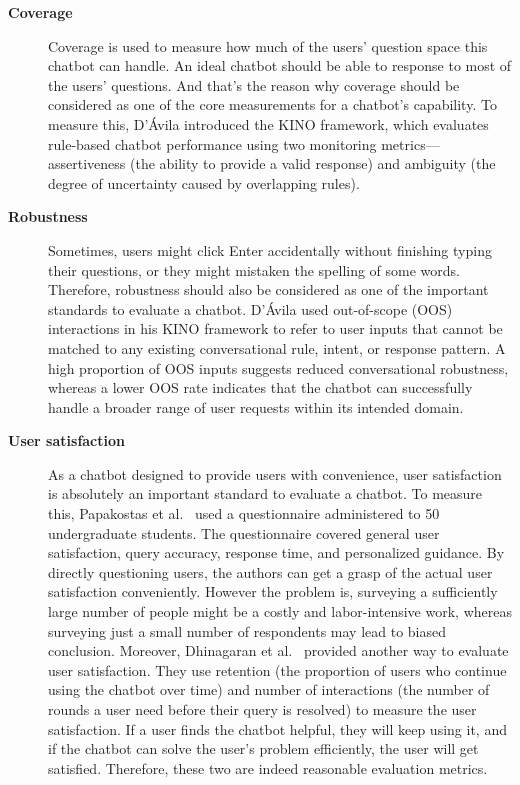 \documentclass[12pt,a4paper]{article}
\begin{document}
\begin{description}
    \item[\textbf{Coverage}] Coverage is used to measure how much of the users' question space this chatbot can handle. An ideal chatbot should be able to response to most of the users' questions. And that's the reason why coverage should be considered as one of the core measurements for a chatbot's capability. To measure this, D'Ávila \cite{davila2018} introduced the KINO framework, which evaluates rule-based chatbot performance using two monitoring metrics---assertiveness (the ability to provide a valid response) and ambiguity (the degree of uncertainty caused by overlapping rules).

    \item[\textbf{Robustness}] Sometimes, users might click Enter accidentally without finishing typing their questions, or they might mistaken the spelling of some words. Therefore, robustness should also be considered as one of the important standards to evaluate a chatbot. D'Ávila \cite{davila2018} used out-of-scope (OOS) interactions in his KINO framework to refer to user inputs that cannot be matched to any existing conversational rule, intent, or response pattern. A high proportion of OOS inputs suggests reduced conversational robustness, whereas a lower OOS rate indicates that the chatbot can successfully handle a broader range of user requests within its intended domain.

    \item[\textbf{User satisfaction}] As a chatbot designed to provide users with convenience, user satisfaction is absolutely an important standard to evaluate a chatbot. To measure this, Papakostas et al.\ \cite{papakostas2024} used a questionnaire administered to 50 undergraduate students. The questionnaire covered general user satisfaction, query accuracy, response time, and personalized guidance. By directly questioning users, the authors can get a grasp of the actual user satisfaction conveniently. However the problem is, surveying a sufficiently large number of people might be a costly and labor-intensive work, whereas surveying just a small number of respondents may lead to biased conclusion. Moreover, Dhinagaran et al.\ \cite{dhinagaran2022} provided another way to evaluate user satisfaction. They use retention (the proportion of users who continue using the chatbot over time) and number of interactions (the number of rounds a user need before their query is resolved) to measure the user satisfaction. If a user finds the chatbot helpful, they will keep using it, and if the chatbot can solve the user's problem efficiently, the user will get satisfied. Therefore, these two are indeed reasonable evaluation metrics.
\end{description}
\end{document}

